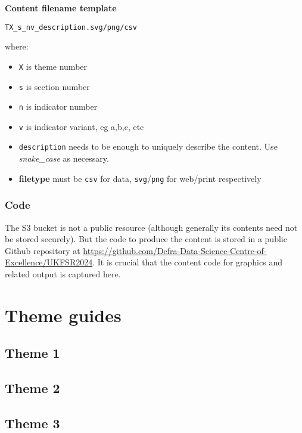 \documentclass[
]{book}
\begin{document}
\textbf{Content filename template}

\texttt{TX\_s\_nv\_description.svg/png/csv}

where:

\begin{itemize}
\item
  \texttt{X} is theme number
\item
  \texttt{s} is section number
\item
  \texttt{n} is indicator number
\item
  \texttt{v} is indicator variant, eg a,b,c, etc
\item
  \texttt{description} needs to be enough to uniquely describe the content. Use \emph{snake\_case} as necessary.
\item
  \textbf{filetype} must be \texttt{csv} for data, \texttt{svg}/\texttt{png} for web/print respectively
\end{itemize}

\hypertarget{code}{%
\subsection{Code}\label{code}}

The S3 bucket is not a public resource (although generally its contents need not be stored securely). But the code to produce the content is stored in a public Github repository at \url{https://github.com/Defra-Data-Science-Centre-of-Excellence/UKFSR2024}. It is crucial that the content code for graphics and related output is captured here.

\hypertarget{theme-guides}{%
\chapter{Theme guides}\label{theme-guides}}

\hypertarget{theme-1}{%
\section{Theme 1}\label{theme-1}}

\hypertarget{theme-2}{%
\section{Theme 2}\label{theme-2}}

\hypertarget{theme-3}{%
\section{Theme 3}\label{theme-3}}
\end{document}
